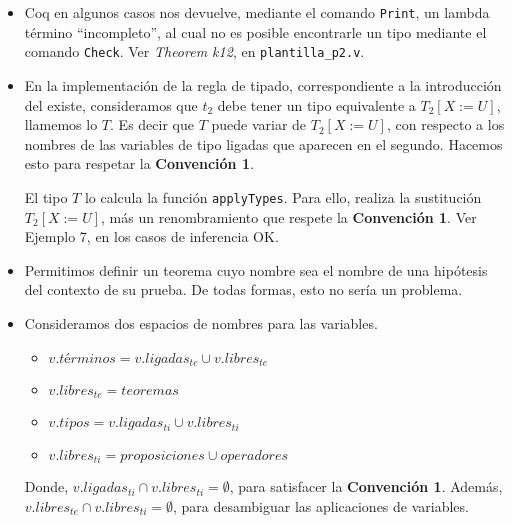 \documentclass[a4paper,11pt]{article}
\theoremstyle{definition}
\begin{document}
\begin{itemize}
  \item Coq en algunos casos nos devuelve, mediante el comando \texttt{Print}, un lambda término ``incompleto'', al cual no es posible encontrarle
  un tipo mediante el comando \texttt{Check}. Ver \textit{Theorem k12}, en \texttt{plantilla\_p2.v}.
  
  \item En la implementación de la regla de tipado, correspondiente a la introducción del existe, consideramos que $t_{2}$ debe tener un tipo equivalente
  a $T_{2}[X:=U]$, llamemos lo $T$. Es decir que $T$ puede variar de $T_{2}[X:=U]$, con respecto a los nombres de las variables de tipo ligadas que aparecen en 
  el segundo.
  Hacemos esto para respetar la \textbf{Convención 1}. 
  
  El tipo $T$ lo calcula la función \texttt{applyTypes}. Para ello, realiza la sustitución $T_{2}[X:=U]$, más un renombramiento que respete la \textbf{Convención 1}.
  Ver Ejemplo 7, en los casos de inferencia OK.
  
  
  \item Permitimos definir un teorema cuyo nombre sea el nombre de una hipótesis del contexto de
  su prueba. De todas formas, esto no sería un problema.
  
  \item Consideramos dos espacios de nombres para las variables.
  \begin{itemize}
    \item $v.términos = v.ligadas_{te} \cup v.libres_{te}$
    \item $v.libres_{te} = teoremas$
    \item $v.tipos = v.ligadas_{ti} \cup v.libres_{ti}$
    \item $v.libres_{ti} = proposiciones \cup operadores$
  \end{itemize}
  
  Donde, $v.ligadas_{ti} \cap v.libres_{ti} = \emptyset$, para satisfacer la \textbf{Convención 1}.
  Además, $v.libres_{te} \cap v.libres_{ti} = \emptyset$, para desambiguar las aplicaciones de variables.
  

\end{itemize}
\end{document}
